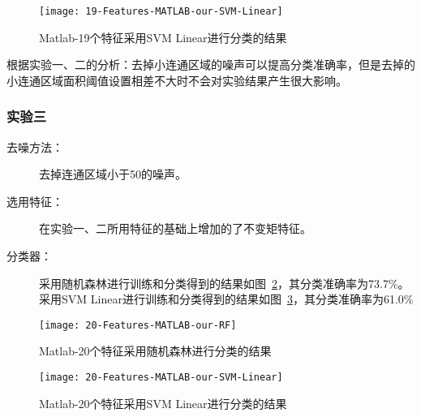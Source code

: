 \begin{figure}[!ht]
\centering
\texttt{[image: 19-Features-MATLAB-our-SVM-Linear]}
\caption{Matlab-19个特征采用SVM Linear进行分类的结果}
\label{fig:19-Features-MATLAB-our-SVM-Linear}
\end{figure}
根据实验一、二的分析：去掉小连通区域的噪声可以提高分类准确率，但是去掉的小连通区域面积阈值设置相差不大时不会对实验结果产生很大影响。

\subsubsection{实验三}
\begin{description}
\item[去噪方法：] 去掉连通区域小于50的噪声。
\item[选用特征：] 在实验一、二所用特征的基础上增加的了不变矩特征。
\item[分类器：] 采用随机森林进行训练和分类得到的结果如图~\ref{fig:20-Features-MATLAB-our-RF}，其分类准确率为73.7\%。采用SVM Linear进行训练和分类得到的结果如图~\ref{fig:20-Features-MATLAB-our-SVM-Linear}，其分类准确率为61.0\%
\end{description}
\begin{figure}[!ht]
\centering
\texttt{[image: 20-Features-MATLAB-our-RF]}
\caption{Matlab-20个特征采用随机森林进行分类的结果}
\label{fig:20-Features-MATLAB-our-RF}
\end{figure}

\begin{figure}[!ht]
\centering
\texttt{[image: 20-Features-MATLAB-our-SVM-Linear]}
\caption{Matlab-20个特征采用SVM Linear进行分类的结果}
\label{fig:20-Features-MATLAB-our-SVM-Linear}
\end{figure}
